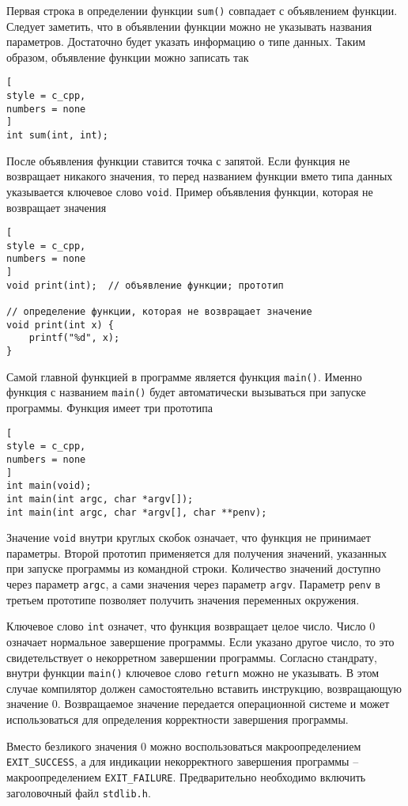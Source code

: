 \documentclass[%
	11pt,
	a4paper,
	utf8,
		]{article}
\begin{document}
Первая строка в определении функции \verb|sum()| совпадает с объявлением функции. Следует заметить, что в объявлении функции можно не указывать названия параметров. Достаточно будет указать информацию о типе данных. Таким образом, объявление функции можно записать так
\begin{lstlisting}[
style = c_cpp,
numbers = none
]
int sum(int, int);
\end{lstlisting}

После объявления функции ставится точка с запятой. Если функция не возвращает никакого значения, то перед названием функции вмето типа данных указывается ключевое слово \verb|void|. Пример объявления функции, которая не возвращает значения
\begin{lstlisting}[
style = c_cpp,
numbers = none
]
void print(int);  // объявление функции; прототип

// определение функции, которая не возвращает значение
void print(int x) {
    printf("%d", x);
}
\end{lstlisting}

Самой главной функцией в программе является функция \verb|main()|. Именно функция с названием \verb|main()| будет автоматически вызываться при запуске программы. Функция имеет три прототипа
\begin{lstlisting}[
style = c_cpp,
numbers = none
]
int main(void);
int main(int argc, char *argv[]);
int main(int argc, char *argv[], char **penv);
\end{lstlisting}

Значение \verb|void| внутри круглых скобок означает, что функция не принимает параметры. Второй прототип применяется для получения значений, указанных при запуске программы из командной строки. Количество значений доступно через параметр \verb|argc|, а сами значения через параметр \verb|argv|. Параметр \verb|penv| в третьем прототипе позволяет получить значения переменных окружения.

Ключевое слово \verb|int| означет, что функция возвращает целое число. Число 0 означает нормальное завершение программы. Если указано другое число, то это свидетельствует о некорретном завершении программы. Согласно стандрату, внутри функции \verb|main()| ключевое слово \verb|return| можно не указывать. В этом случае компилятор должен самостоятельно вставить инструкцию, возвращающую значение 0. Возвращаемое значение передается операционной системе и может использоваться для определения корректности завершения программы.

Вместо безликого значения 0 можно воспользоваться макроопределением \verb|EXIT_SUCCESS|, а для индикации некорректного завершения программы -- макроопределением \verb|EXIT_FAILURE|. Предварительно необходимо включить заголовочный файл \verb|stdlib.h|.
\end{document}
